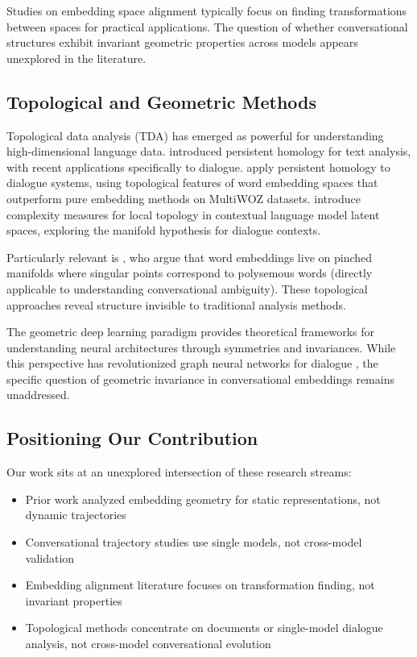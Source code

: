 \documentclass[11pt,letterpaper]{article}
\begin{document}
Studies on embedding space alignment typically focus on finding transformations between spaces \citep{conneau2018word} for practical applications. The question of whether conversational structures exhibit invariant geometric properties across models appears unexplored in the literature.

\subsection{Topological and Geometric Methods}

Topological data analysis (TDA) has emerged as powerful for understanding high-dimensional language data. \citet{zhu2013persistent} introduced persistent homology for text analysis, with recent applications specifically to dialogue. \citet{vukovic2022dialogue} apply persistent homology to dialogue systems, using topological features of word embedding spaces that outperform pure embedding methods on MultiWOZ datasets. \citet{ruppik2024topology} introduce complexity measures for local topology in contextual language model latent spaces, exploring the manifold hypothesis for dialogue contexts.

Particularly relevant is \citet{jakubowski2020topology}, who argue that word embeddings live on pinched manifolds where singular points correspond to polysemous words (directly applicable to understanding conversational ambiguity). These topological approaches reveal structure invisible to traditional analysis methods.

The geometric deep learning paradigm \citep{bronstein2021geometric} provides theoretical frameworks for understanding neural architectures through symmetries and invariances. While this perspective has revolutionized graph neural networks for dialogue \citep{ghosal2019dialoguegcn}, the specific question of geometric invariance in conversational embeddings remains unaddressed.

\subsection{Positioning Our Contribution}

Our work sits at an unexplored intersection of these research streams:

\begin{itemize}
\item Prior work analyzed embedding geometry for static representations, not dynamic trajectories
\item Conversational trajectory studies use single models, not cross-model validation
\item Embedding alignment literature focuses on transformation finding, not invariant properties
\item Topological methods concentrate on documents or single-model dialogue analysis, not cross-model conversational evolution
\end{itemize}
\end{document}
